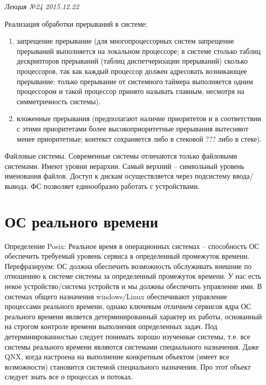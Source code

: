 \clearpage
\begin{flushright}
	\textit{Лекция №24}
	\textit{2015.12.22}
\end{flushright}

Реализация обработки прерываний в системе:
\begin{enumerate}
    \item запрещение прерывание (для многопроцессорных систем запрещение прерываний выполняется на локальном процессоре; в системе столько таблиц дескрипторов прерываний (таблиц диспетчеризации прерываний) сколько процессоров, так как каждый процессор должен адресовать возникающее прерывание; только прерывание от системного таймера выполняется одним процессором и такой процессор принято называть главным, несмотря на симметричность системы). 
    \item вложенные прерывания (предполагают наличие приоритетов и в соответствии с этими приоритетами более высокоприоритетные прерывания вытесняют менее приоритетные; контекст сохраняется либо в стековой ??? либо в стеке). 
\end{enumerate} 

Файловые системы. Современные системы отличаются только файловыми системами. Имеют уровни иерархии. Самый верхний – символьный уровень именования файлов. Доступ к дискам осуществляется через подсистему ввода/вывода.  ФС позволяет единообразно работать с устройствами. 


\chapter{ОС реального времени}

Определение Posix: 
Реальное время в операционных системах – способность ОС обеспечить требуемый уровень сервиса в определенный промежуток времени. 
Перефразируем: ОС должна обеспечить возможность обслуживать внешние по отношению к системе системы за определенный промежуток времени. У нас есть некое устройство/система устройств и мы должны обеспечить управление ими. 
В системах общего назначения windows/Linux обеспечивают управление процессами реального времени, однако ключевым отличием сервисов ядра ОС реального времени является детерминированный характер их работы, основанный на строгом контроле времени выполнения определенных задач. Под детерминированностью следует понимать хорошо изученные системы, т.е. все системы реального времени являются системами специального назначения. Даже QNX, когда настроена на выполнение конкретным объектом (имеет все возможности) становится системой специального назначения. Про этот объект следует знать все о процессах и потоках. 

